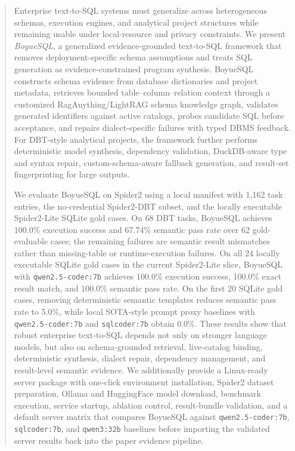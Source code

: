 \begin{abstract}
Enterprise text-to-SQL systems must generalize across heterogeneous schemas,
execution engines, and analytical project structures while remaining usable
under local-resource and privacy constraints. We present \emph{BoyueSQL}, a
generalized evidence-grounded text-to-SQL framework that removes
deployment-specific schema assumptions and treats SQL generation as
evidence-constrained program synthesis. BoyueSQL constructs schema evidence
from database dictionaries and project metadata, retrieves bounded
table--column--relation context through a customized RagAnything/LightRAG
schema knowledge graph, validates generated identifiers against active
catalogs, probes candidate SQL before acceptance, and repairs dialect-specific
failures with typed DBMS feedback. For DBT-style analytical projects, the
framework further performs deterministic model synthesis, dependency
validation, DuckDB-aware type and syntax repair, custom-schema-aware fallback
generation, and result-set fingerprinting for large outputs.

We evaluate BoyueSQL on Spider2 using a local manifest with 1,162 task
entries, the no-credential Spider2-DBT subset, and the locally executable
Spider2-Lite SQLite gold cases. On 68 DBT tasks, BoyueSQL achieves 100.0\%
execution success and 67.74\% semantic pass rate over 62 gold-evaluable cases;
the remaining failures are semantic result mismatches rather than
missing-table or runtime-execution failures. On all 24 locally executable
SQLite gold cases in the current Spider2-Lite slice, BoyueSQL with
\texttt{qwen2.5-coder:7b} achieves 100.0\% execution success, 100.0\% exact
result match, and 100.0\% semantic pass rate. On the first 20 SQLite gold
cases, removing deterministic semantic templates reduces semantic pass rate to
5.0\%, while local SOTA-style prompt proxy baselines with
\texttt{qwen2.5-coder:7b} and \texttt{sqlcoder:7b} obtain 0.0\%. These results
show that robust enterprise text-to-SQL depends not only on stronger language
models, but also on schema-grounded retrieval, live-catalog binding,
deterministic synthesis, dialect repair, dependency management, and
result-level semantic evidence. We additionally provide a Linux-ready server
package with one-click environment installation, Spider2 dataset preparation,
Ollama and HuggingFace model download, benchmark execution, service startup,
ablation control, result-bundle validation, and a default server matrix that
compares BoyueSQL against \texttt{qwen2.5-coder:7b}, \texttt{sqlcoder:7b},
and \texttt{qwen3:32b} baselines before importing the validated server results
back into the paper evidence pipeline.
\end{abstract}
